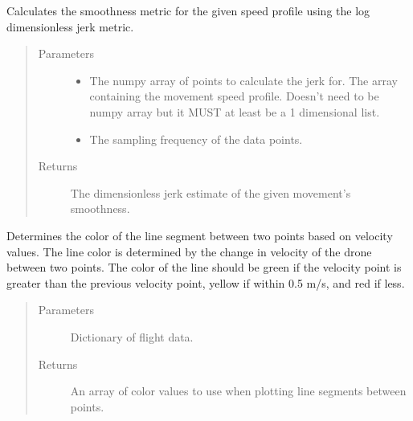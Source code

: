 \documentclass[letterpaper,10pt,english]{sphinxmanual}
\begin{document}
\begin{fulllineitems}
\label{\detokenize{index:src.Views.Graph.log_dimensionless_jerk}}
Calculates the smoothness metric for the given speed profile using the log dimensionless jerk
metric.
\begin{quote}\begin{description}
\item[{Parameters}] \leavevmode\begin{itemize}
\item {} 
 \textendash{} The numpy array of points to calculate the jerk for. The array containing the movement speed profile. Doesn’t need to be numpy array but it MUST at least be a 1 dimensional list.

\item {} 
 \textendash{} The sampling frequency of the data points.

\end{itemize}

\item[{Returns}] \leavevmode
The dimensionless jerk estimate of the given movement’s smoothness.

\end{description}\end{quote}

\end{fulllineitems}


\begin{fulllineitems}
\label{\detokenize{index:src.Views.Graph.velocityColors}}
Determines the color of the line segment between two points based on velocity values. The line color is determined
by the change in velocity of the drone between two points. The color of the line should be green if the
velocity point is greater than the previous velocity point, yellow if within 0.5 m/s, and red if less.
\begin{quote}\begin{description}
\item[{Parameters}] \leavevmode
{} \textendash{} Dictionary of flight data.

\item[{Returns}] \leavevmode
An array of color values to use when plotting line segments between points.

\end{description}\end{quote}

\end{fulllineitems}
\end{document}
